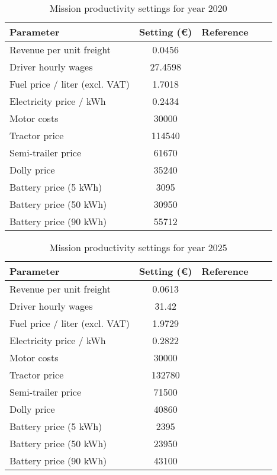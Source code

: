 \documentclass[ExampleMasters.tex]{subfiles}
\begin{document}
		\begin{table}[ht]
			\centering 
			\begin{tabular}{l c c c c}
	  			\hline
				Parameter & Setting (\euro) & Reference\\
				\hline
				\hline
				Revenue per unit freight & 0.0456 & \cite{EuAECOM2}\\
			    Driver hourly wages  & 27.4598 & \cite{EuAECOM2}\\
			    Fuel price / liter (excl. VAT)  & 1.7018  & \cite{EuAECOM2}\\
			    Electricity price / kWh  & 0.2434 & \cite{EUelectricity}\\
			    Motor costs  & 30000 & \cite{EuPLot30Motors}\\
			    Tractor price & 114540 & \cite{FrostSullivan}\\
			    Semi-trailer price & 61670 & \cite{FrostSullivan}\\
			    Dolly price & 35240 & \cite{FrostSullivan}\\
			    Battery price (5 kWh) & 3095 & \cite{ElementEnergy}\\
			    Battery price (50 kWh) & 30950 & \cite{ElementEnergy}\\
			    Battery price (90 kWh) & 55712 & \cite{ElementEnergy}\\
			\hline 
			\end{tabular}
			\caption{Mission productivity settings for year 2020} 
			\label{table:MissionProdSet2020} 
		\end{table}		

		\begin{table}[ht]
			\centering 
			\begin{tabular}{l c c c c}
	  			\hline
				Parameter & Setting (\euro) & Reference\\
				\hline
				\hline
				Revenue per unit freight & 0.0613 & \cite{EuAECOM2}\\
			    Driver hourly wages  & 31.42 & \cite{EuAECOM2}\\
			    Fuel price / liter (excl. VAT)  & 1.9729  & \cite{EuAECOM2}\\
			    Electricity price / kWh  & 0.2822 & \cite{EUelectricity}\\
			    Motor costs  & 30000 & \cite{EuPLot30Motors}\\
			    Tractor price & 132780 & \cite{FrostSullivan}\\
			    Semi-trailer price & 71500 & \cite{FrostSullivan}\\
			    Dolly price & 40860 & \cite{FrostSullivan}\\
			    Battery price (5 kWh) & 2395 & \cite{ElementEnergy}\\
			    Battery price (50 kWh) & 23950 & \cite{ElementEnergy}\\
			    Battery price (90 kWh) & 43100 & \cite{ElementEnergy}\\
			\hline 
			\end{tabular}
			\caption{Mission productivity settings for year 2025} 
			\label{table:MissionProdSet2025} 
		\end{table}
\end{document}
